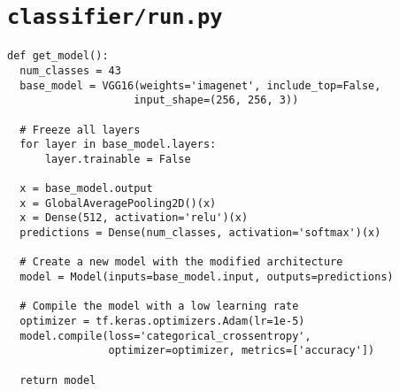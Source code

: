 \section*{\lstinline{classifier/run.py}}

\begin{code}
\begin{verbatim}
def get_model():
  num_classes = 43
  base_model = VGG16(weights='imagenet', include_top=False, 
                    input_shape=(256, 256, 3))

  # Freeze all layers
  for layer in base_model.layers:
      layer.trainable = False

  x = base_model.output
  x = GlobalAveragePooling2D()(x)
  x = Dense(512, activation='relu')(x)
  predictions = Dense(num_classes, activation='softmax')(x)

  # Create a new model with the modified architecture
  model = Model(inputs=base_model.input, outputs=predictions)

  # Compile the model with a low learning rate
  optimizer = tf.keras.optimizers.Adam(lr=1e-5)
  model.compile(loss='categorical_crossentropy', 
                optimizer=optimizer, metrics=['accuracy'])

  return model
\end{verbatim}
\label{lst:vgg16}
\end{code}


